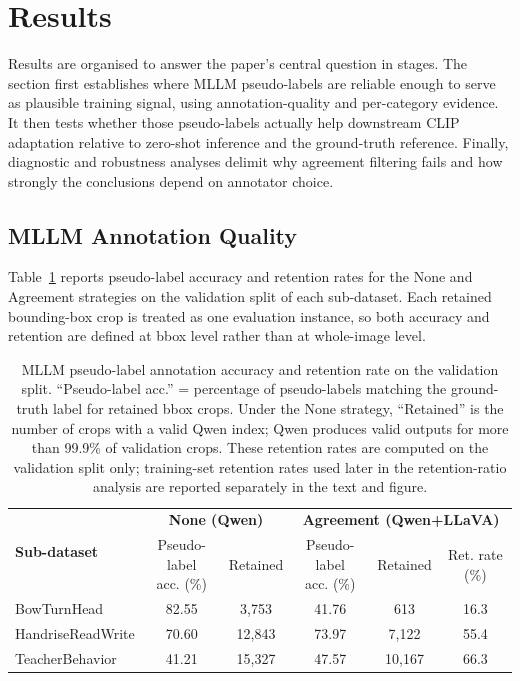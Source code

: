 \documentclass[10pt,letterpaper]{article}
\begin{document}
\section*{Results}
\label{sec:results}

Results are organised to answer the paper's central question in stages.
The section first establishes where MLLM pseudo-labels are reliable
enough to serve as plausible training signal, using annotation-quality
and per-category evidence.
It then tests whether those pseudo-labels actually help downstream
CLIP adaptation relative to zero-shot inference and the ground-truth
reference.
Finally, diagnostic and robustness analyses delimit why agreement
filtering fails and how strongly the conclusions depend on annotator
choice.

\subsection*{MLLM Annotation Quality}
\label{sec:annot_quality}

Table~\ref{tab:annotation_quality} reports pseudo-label accuracy and
retention rates for the None and Agreement strategies on the
validation split of each sub-dataset.
Each retained bounding-box crop is treated as one evaluation instance,
so both accuracy and retention are defined at bbox level rather than at
whole-image level.

\begin{table}[H]
\caption{MLLM pseudo-label annotation accuracy and retention rate
on the validation split. ``Pseudo-label acc.'' = percentage of pseudo-labels
matching the ground-truth label for retained bbox crops. Under the None strategy,
``Retained'' is the number of crops with a valid Qwen index; Qwen
produces valid outputs for more than 99.9\% of validation crops.
These retention rates are computed on the validation split only;
training-set retention rates used later in the retention-ratio analysis
are reported separately in the text and figure.}
\label{tab:annotation_quality}
\centering
\begin{tabular}{lccccc}
\toprule
\multirow{2}{*}{\textbf{Sub-dataset}} &
\multicolumn{2}{c}{\textbf{None (Qwen)}} &
\multicolumn{3}{c}{\textbf{Agreement (Qwen+LLaVA)}} \\
\cmidrule(lr){2-3}\cmidrule(lr){4-6}
 & \shortstack{Pseudo-label\\acc. (\%)} & Retained & \shortstack{Pseudo-label\\acc. (\%)} & Retained & Ret. rate (\%) \\
\midrule
BowTurnHead       & 82.55 & 3{,}753 & 41.76 & 613  & 16.3 \\
HandriseReadWrite & 70.60 & 12{,}843 & 73.97 & 7{,}122 & 55.4 \\
TeacherBehavior   & 41.21 & 15{,}327 & 47.57 & 10{,}167 & 66.3 \\
\bottomrule
\end{tabular}
\end{table}
\end{document}
